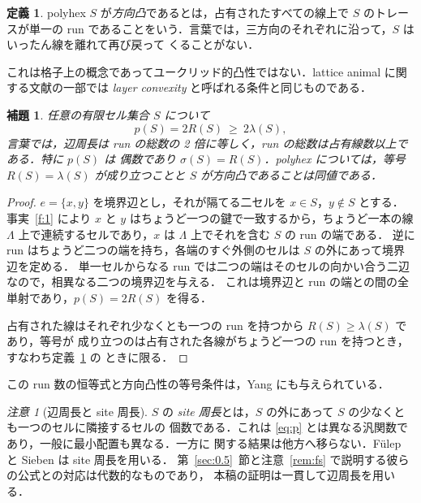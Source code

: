 \documentclass[11pt]{article}
\theoremstyle{plain}
\newtheorem{lemma}[theorem]{補題}
\theoremstyle{definition}
\newtheorem{definition}[theorem]{定義}
\theoremstyle{remark}
\newtheorem{remark}[theorem]{注意}
\begin{document}
\begin{definition}\label{def:dconv}
polyhex \(S\) が\emph{方向凸}であるとは，占有されたすべての線上で \(S\) のトレースが単一の
run であることをいう．言葉では，三方向のそれぞれに沿って，\(S\) はいったん線を離れて再び戻って
くることがない．
\end{definition}

これは格子上の概念であってユークリッド的凸性ではない．lattice animal に関する文献の一部では
\emph{layer convexity} と呼ばれる条件と同じものである．

\begin{lemma}\label{lem:runs}
任意の有限セル集合 \(S\) について
\begin{equation}\label{eq:pruns}
   p(S)=2R(S)\ \ge\ 2\lambda(S),
\end{equation}
言葉では，辺周長は run の総数の 2 倍に等しく，run の総数は占有線数以上である．特に \(p(S)\) は
偶数であり \(\sigma(S)=R(S)\)．polyhex については，等号 \(R(S)=\lambda(S)\) が成り立つことと
\(S\) が方向凸であることは同値である．
\end{lemma}

\begin{proof}
\(e=\{x,y\}\) を境界辺とし，それが隔てる二セルを \(x\in S\)，\(y\notin S\) とする．
事実~\ref{f:1} により \(x\) と \(y\) はちょうど一つの鍵で一致するから，ちょうど一本の線
\(\Lambda\) 上で連続するセルであり，\(x\) は \(\Lambda\) 上でそれを含む \(S\) の run の端である．
逆に run はちょうど二つの端を持ち，各端のすぐ外側のセルは \(S\) の外にあって境界辺を定める．
単一セルからなる run では二つの端はそのセルの向かい合う二辺なので，相異なる二つの境界辺を与える．
これは境界辺と run の端との間の全単射であり，\(p(S)=2R(S)\) を得る．

占有された線はそれぞれ少なくとも一つの run を持つから \(R(S)\ge\lambda(S)\) であり，等号が
成り立つのは占有された各線がちょうど一つの run を持つとき，すなわち定義~\ref{def:dconv} の
ときに限る．
\end{proof}
この run 数の恒等式と方向凸性の等号条件は，Yang
\cite[Theorems~4--5]{Yang2002} にも与えられている．


\begin{remark}[辺周長と site 周長]\label{rem:site}
$S$ の \emph{site 周長}とは，$S$ の外にあって $S$ の少なくとも一つのセルに隣接するセルの
個数である．これは \eqref{eq:p} とは異なる汎関数であり，一般に最小配置も異なる．一方に
関する結果は他方へ移らない．Fülep と Sieben \cite{FulepSieben2010} は site 周長を用いる．
第~\ref{sec:0.5}~節と注意~\ref{rem:fs} で説明する彼らの公式との対応は代数的なものであり，
本稿の証明は一貫して辺周長を用いる．
\end{remark}
\end{document}
